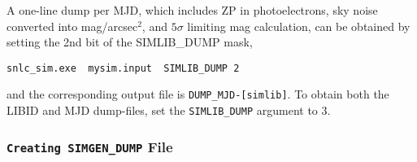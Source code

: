 \documentclass[12pt]{article}
\begin{document}
A one-line dump per MJD, which includes ZP in photoelectrons,
sky noise converted into mag/arcsec$^2$, and $5\sigma$ limiting
mag calculation, can be obtained by setting the 2nd bit
of the SIMLIB\_DUMP mask,
%
\begin{Verbatim}[frame=single]
    snlc_sim.exe  mysim.input  SIMLIB_DUMP 2
\end{Verbatim}
and the corresponding output file is 
{\tt DUMP\_MJD-[simlib]}. To obtain both the LIBID and MJD
dump-files, set the {\tt SIMLIB\_DUMP} argument to 3.





   \subsubsection{{\tt Creating SIMGEN\_DUMP} File }
   \label{sss:simgen_dump}
\end{document}
